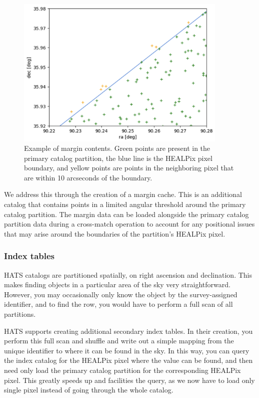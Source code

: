 \documentclass[11pt,a4paper]{ivoa}
\begin{document}
\begin{figure}
\centering
\includegraphics[width=0.9\textwidth]{margin-pix.png}
\caption{Example of margin contents. Green points are present in the primary catalog partition, the blue line is the HEALPix pixel boundary, and yellow points are points in the neighboring pixel that are within 10 arcseconds of the boundary.}
\label{fig:margin}
\end{figure}

We address this through the creation of a margin cache.
This is an additional catalog that contains points in a limited angular threshold around the primary catalog partition.
The margin data can be loaded alongside the primary catalog partition data during a cross-match operation to account for any positional issues that may arise around the boundaries of the partition's HEALPix pixel.

\subsubsection{Index tables} \label{sec:index}

HATS catalogs are partitioned spatially, on right ascension and declination. 
This makes finding objects in a particular area of the sky very straightforward. 
However, you may occasionally only know the object by the survey-assigned identifier, and to find the row, you would have to perform a full scan of all partitions. \par

HATS supports creating additional secondary index tables. 
In their creation, you perform this full scan and shuffle and write out a simple mapping from the unique identifier to where it can be found in the sky.
In this way, you can query the index catalog for the HEALPix pixel where the value can be found, and then need only load the primary catalog partition for the corresponding HEALPix pixel. 
This greatly speeds up and facilities the query, as we now have to load only single pixel instead of going through the whole catalog.
\end{document}
